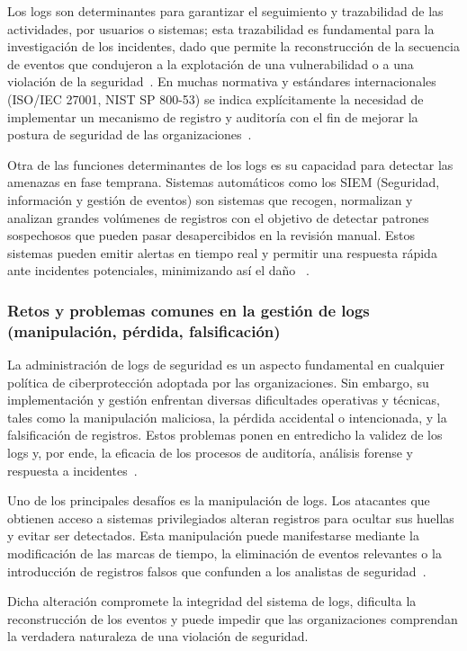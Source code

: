 Los logs son determinantes para garantizar el seguimiento y trazabilidad de las actividades, por usuarios o sistemas; esta trazabilidad es fundamental para la investigación de los incidentes, dado que permite la reconstrucción de la secuencia de eventos que condujeron a la explotación de una vulnerabilidad o a una violación de la seguridad~\cite{axelsson2000ids}. En muchas normativa y estándares internacionales (ISO/IEC 27001, NIST SP 800-53) se indica explícitamente la necesidad de implementar un mecanismo de registro y auditoría con el fin de mejorar la postura de seguridad de las organizaciones~\cite{iso27001}.

Otra de las funciones determinantes de los logs es su capacidad para detectar las amenazas en fase temprana. Sistemas automáticos como los SIEM (Seguridad, información y gestión de eventos) son sistemas que recogen, normalizan y analizan grandes volúmenes de registros con el objetivo de detectar patrones sospechosos que pueden pasar desapercibidos en la revisión manual. Estos sistemas pueden emitir alertas en tiempo real y permitir una respuesta rápida ante incidentes potenciales, minimizando así el daño ~\cite{kabiri2005survey}.

\subsubsection{Retos y problemas comunes en la gestión de logs (manipulación, pérdida, falsificación)}
La administración de logs de seguridad es un aspecto fundamental en cualquier política de ciberprotección adoptada por las organizaciones. Sin embargo, su implementación y gestión enfrentan diversas dificultades operativas y técnicas, tales como la manipulación maliciosa, la pérdida accidental o intencionada, y la falsificación de registros. Estos problemas ponen en entredicho la validez de los logs y, por ende, la eficacia de los procesos de auditoría, análisis forense y respuesta a incidentes~\cite{kent2006log}.

Uno de los principales desafíos es la manipulación de logs. Los atacantes que obtienen acceso a sistemas privilegiados alteran registros para ocultar sus huellas y evitar ser detectados. Esta manipulación puede manifestarse mediante la modificación de las marcas de tiempo, la eliminación de eventos relevantes o la introducción de registros falsos que confunden a los analistas de seguridad~\cite{axelsson2000base}.

Dicha alteración compromete la integridad del sistema de logs, dificulta la reconstrucción de los eventos y puede impedir que las organizaciones comprendan la verdadera naturaleza de una violación de seguridad.

